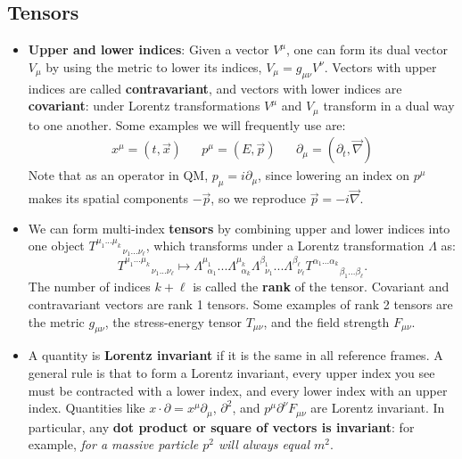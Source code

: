 \documentclass[12pt]{article}
\theoremstyle{mytheorem}
\begin{document}
\subsection*{Tensors}

\begin{itemize}
	\item \textbf{Upper and lower indices}: Given a vector $V^\mu$, one can form its dual vector $V_\mu$ by using the 
	metric to lower its indices, $V_\mu = g_{\mu\nu} V^\nu$. Vectors with upper indices are called \textbf{contravariant}, 
	and vectors with lower indices are \textbf{covariant}: under Lorentz transformations $V^\mu$ and $V_\mu$ transform 
	in a dual way to one another. Some examples we will frequently use are:
	\begin{align}
		x^\mu = (t, \vec x) && p^\mu = (E, \vec p) && \partial_\mu = (\partial_t, \vec \nabla)
	\end{align}
	Note that as an operator in QM, $p_\mu = i\partial_\mu$, since lowering an index on $p^\mu$ makes its spatial components 
	$-\vec p$, so we reproduce $\vec p = -i\vec\nabla$. 
	\item We can form multi-index \textbf{tensors} by combining upper and lower indices into 
	one object $T^{\mu_1 ... \mu_k}_{\;\;\;\;\;\;\;\;\;\;\;\nu_1 ... \nu_\ell}$, which transforms under a Lorentz transformation $\Lambda$ as:
	\begin{equation}
		T^{\mu_1 ... \mu_k}_{\;\;\;\;\;\;\;\;\;\;\;\nu_1 ... \nu_\ell}\mapsto \Lambda^{\mu_1}_{\;\;\alpha_1} ... \Lambda^{\mu_k}_{\;\;\alpha_k} 
		\Lambda_{\;\;\nu_1}^{\beta_1} ... \Lambda_{\;\;\nu_\ell}^{\beta_\ell} T^{\alpha_1 ... \alpha_k}_{\;\;\;\;\;\;\;\;\;\;\;\beta_1 ... \beta_\ell}.
	\end{equation}
	The number of indices $k + \ell$ is called the \textbf{rank} of the tensor. Covariant and contravariant vectors are 
	rank 1 tensors. Some examples of rank 2 tensors are the metric $g_{\mu\nu}$, the stress-energy tensor $T_{\mu\nu}$, 
	and the field strength $F_{\mu\nu}$.
	
	\item A quantity is \textbf{Lorentz invariant} if it is the same in all reference frames. A general rule is that to form 
	a Lorentz invariant, every upper index you see must be contracted with a lower index, and every lower 
	index with an upper index. Quantities like $x\cdot \partial = x^\mu\partial_\mu$, $\partial^2$, and $p^\mu \partial^\nu F_{\mu\nu}$ are 
	Lorentz invariant. In particular, any \textbf{dot product or square of vectors is invariant}: for example, \textit{for a 
	massive particle $p^2$ will always equal $m^2$}. 
	

\end{itemize}
\end{document}
